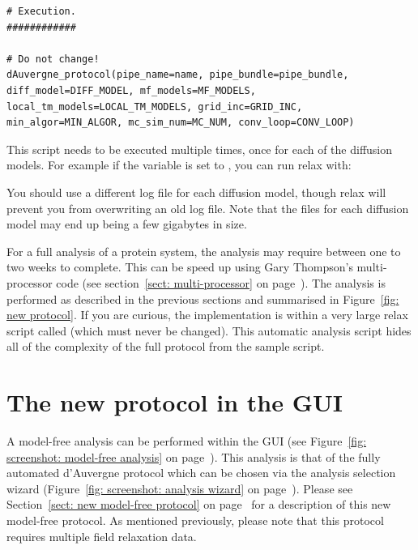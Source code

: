 \begin{lstlisting}[firstnumber=203]
# Execution.
############

# Do not change!
dAuvergne_protocol(pipe_name=name, pipe_bundle=pipe_bundle, diff_model=DIFF_MODEL, mf_models=MF_MODELS, local_tm_models=LOCAL_TM_MODELS, grid_inc=GRID_INC, min_algor=MIN_ALGOR, mc_sim_num=MC_NUM, conv_loop=CONV_LOOP)
\end{lstlisting}

This script needs to be executed multiple times, once for each of the diffusion models.
For example if the  variable is set to , you can run relax with:


You should use a different log file for each diffusion model, though relax will prevent you from overwriting an old log file.
Note that the  files for each diffusion model may end up being a few gigabytes in size.

For a full analysis of a protein system, the analysis may require between one to two weeks to complete.
This can be speed up using Gary Thompson's multi-processor code (see section~\ref{sect: multi-processor} on page~\pageref{sect: multi-processor}).
The analysis is performed as described in the previous sections and summarised in Figure~\ref{fig: new protocol}.
If you are curious, the implementation is within a very large relax script called  (which must never be changed).
This automatic analysis script hides all of the complexity of the full protocol from the sample script.




\newpage
\section{The new protocol in the GUI}

A model-free analysis can be performed within the GUI (see Figure~\ref{fig: screenshot: model-free analysis} on page~\pageref{fig: screenshot: model-free analysis}).
This analysis is that of the fully automated d'Auvergne protocol which can be chosen via the analysis selection wizard (Figure~\ref{fig: screenshot: analysis wizard} on page~\pageref{fig: screenshot: analysis wizard}).
Please see Section~\ref{sect: new model-free protocol} on page~\pageref{sect: new model-free protocol} for a description of this new model-free protocol.
As mentioned previously, please note that this protocol requires multiple field relaxation data.

